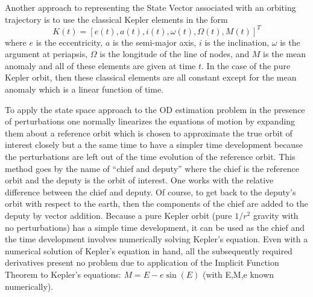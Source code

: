 Another approach to representing the State Vector associated with an orbiting trajectory is to use the classical Kepler elements in the form
$$K(t) = [e(t), a(t), i(t), \omega(t), \Omega(t), M(t)]^T$$where $e$ is the eccentricity, $a$ is the semi-major axis, $i$ is the inclination, $\omega$ is the argument at periapsis, $\Omega$ is the longitude of the line of nodes, and $M$ is the mean anomaly and all of these elements
are given at time $t$. In the case of the pure Kepler orbit, then these classical elements are all constant except for the mean anomaly which is a linear function of time. 

To apply the state space approach to the OD estimation problem in the presence of perturbations one normally linearizes the equations of motion by expanding them about a reference orbit which is chosen to approximate the true orbit of interest closely but a the same time to have a simpler time development because the perturbations are left out of the time evolution of the reference orbit. This method goes by the name of ``chief and deputy'' where the chief is the reference 
orbit and the deputy is the orbit of interest. One works with the relative difference between the chief and deputy. Of course, to get back to the deputy's orbit with respect to the earth, then the components of the chief are added to the deputy by vector addition. Because a pure Kepler orbit (pure $1/r^2$ gravity with no perturbations) has a simple time development, it can be used as the chief and the time development involves numerically solving Kepler's equation. Even with a numerical solution of Kepler's equation in hand, all the subsequently required derivatives present no problem due to application of the Implicit Function Theorem to Kepler's equations: $M = E - e\sin(E)$ (with E,M,e known numerically). \\

